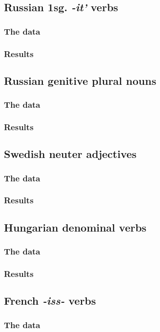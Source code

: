 \documentclass{upenndiss}
\begin{document}
\subsection{Russian 1sg. \emph{-it'} verbs}
\subsubsection{The data}
\subsubsection{Results}
\subsection{Russian genitive plural nouns}
\subsubsection{The data}
\subsubsection{Results}
\subsection{Swedish neuter adjectives}
\subsubsection{The data}
\subsubsection{Results}
\subsection{Hungarian denominal verbs}
\subsubsection{The data}
\subsubsection{Results}
\subsection{French \emph{-iss-} verbs}
\subsubsection{The data}
\end{document}
